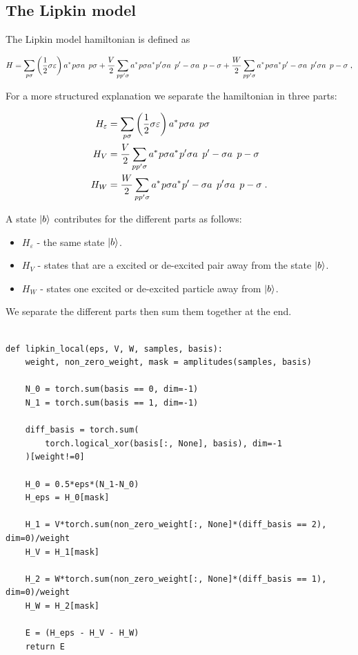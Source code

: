 \subsection{The Lipkin model}

The Lipkin model hamiltonian is defined as

\begin{equation} 
    H = \sum_{p\sigma} \left ( \frac{1}{2} \sigma \varepsilon \right ) \hc{a}{p\sigma}\op{a}{p\sigma} + \frac{V}{2}\sum_{pp'\sigma} \hc{a}{p\sigma} \hc{a}{p'\sigma} \op{a}{p'-\sigma}\op{a}{p-\sigma} + \frac{W}{2} \sum_{pp'\sigma} \hc{a}{p\sigma} \hc{a}{p'-\sigma} \op{a}{p'\sigma}\op{a}{p-\sigma} \; , 
\end{equation}

For a more structured explanation we separate the hamiltonian in three parts:

\begin{align}
  H_{\varepsilon} &= \sum_{p\sigma} \left ( \frac{1}{2} \sigma \varepsilon \right ) \hc{a}{p\sigma}\op{a}{p\sigma}\\ 
  H_V &= \frac{V}{2}\sum_{pp'\sigma} \hc{a}{p\sigma} \hc{a}{p'\sigma} \op{a}{p'-\sigma}\op{a}{p-\sigma}\\
  H_W &= \frac{W}{2} \sum_{pp'\sigma} \hc{a}{p\sigma} \hc{a}{p'-\sigma} \op{a}{p'\sigma}\op{a}{p-\sigma}  \; .
  \label{eq:LMG_split_H}
\end{align}

 A state $\ket{b}$ contributes for the different parts as follows:

\begin{itemize}
  \item $H_{\varepsilon}$ - the same state $\ket{b}$.
  \item $H_V$ - states that are a excited or de-excited pair away from the state $\ket{b}$.
  \item $H_W$ - states one excited or de-excited particle away from $\ket{b}$.
\end{itemize}

We separate the different parts then sum them together at the end.

\begin{verbatim}

def lipkin_local(eps, V, W, samples, basis):
    weight, non_zero_weight, mask = amplitudes(samples, basis)

    N_0 = torch.sum(basis == 0, dim=-1)
    N_1 = torch.sum(basis == 1, dim=-1)

    diff_basis = torch.sum(
        torch.logical_xor(basis[:, None], basis), dim=-1
    )[weight!=0]
    
    H_0 = 0.5*eps*(N_1-N_0)
    H_eps = H_0[mask]

    H_1 = V*torch.sum(non_zero_weight[:, None]*(diff_basis == 2), dim=0)/weight
    H_V = H_1[mask]
    
    H_2 = W*torch.sum(non_zero_weight[:, None]*(diff_basis == 1), dim=0)/weight
    H_W = H_2[mask]
    
    E = (H_eps - H_V - H_W)
    return E

\end{verbatim}

